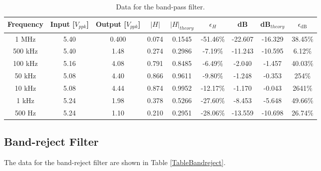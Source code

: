 \documentclass{article}
\begin{document}
\begin{table}[H]\centering
    \begin{tabular}{ccccccccc}
        \toprule
        Frequency & Input [$V_{ppk}$] & Output [$V_{ppk}$] & $|H|$  & $|H|_{theory}$ & $\epsilon_H$ & dB       & dB$_{theory}$ & $\epsilon_{\text{dB}}$ \\
        \midrule
        1 MHz     & 5.40              & 0.400  & 0.074 & 0.1545         & -51.46$\%$   & -22.607 & -16.329     & 38.45$\%$              \\
        500 kHz   & 5.40              & 1.48   & 0.274 & 0.2986         & -7.19$\%$    & -11.243 & -10.595     & 6.12$\%$               \\
        100 kHz   & 5.16              & 4.08   & 0.791 & 0.8485         & -6.49$\%$    & -2.040  & -1.457      & 40.03$\%$              \\
        50 kHz    & 5.08              & 4.40   & 0.866 & 0.9611         & -9.80$\%$    & -1.248  & -0.353      & 254$\%$               \\
        10 kHz    & 5.08              & 4.44   & 0.874 & 0.9952         & -12.17$\%$   & -1.170  & -0.043      & 2641$\%$                \\
        1 kHz     & 5.24              & 1.98   & 0.378 & 0.5266         & -27.60$\%$   & -8.453  & -5.648      & 49.66$\%$              \\
        500 Hz    & 5.24              & 1.10   & 0.210 & 0.2951         & -28.06$\%$   & -13.559 & -10.698     & 26.74$\%$              \\
        \bottomrule
    \end{tabular}
    \caption{Data for the band-pass filter.}\label{TableBandpass}
\end{table}

\subsection{Band-reject Filter}
The data for the band-reject filter are shown in Table \ref{TableBandreject}.
\end{document}
